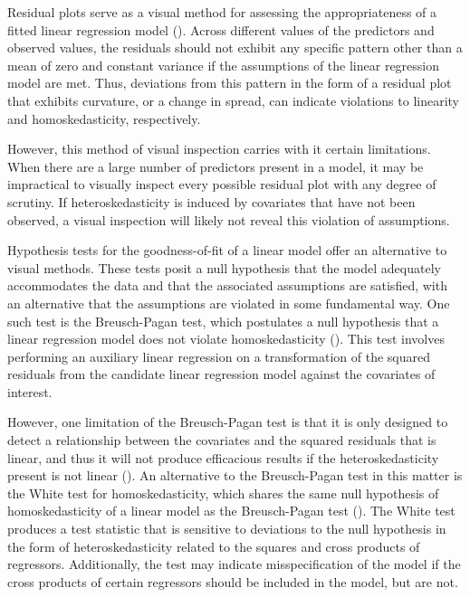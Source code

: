 \documentclass[12pt]{article} %
\theoremstyle{definition}
\begin{document}
		Residual plots serve as a visual method for assessing the appropriateness of a fitted linear regression model (\cite{Miles}). Across different values
		of the predictors and observed values, the residuals should not exhibit any specific pattern other than a mean of zero and constant variance if the assumptions of the linear regression model are met.
		Thus, deviations from this pattern in the form of a residual plot that exhibits curvature, or a change in spread, can indicate violations to linearity and homoskedasticity, respectively. 

		However, this method of visual inspection carries with it certain limitations. When there are a large number of predictors present in a model, it may be impractical to visually inspect every
		possible residual plot with any degree of scrutiny. If heteroskedasticity is induced by covariates that have not been observed, a visual inspection will likely
		not reveal this violation of assumptions.

		Hypothesis tests for the goodness-of-fit of a linear model offer an alternative to visual methods. These tests posit a null hypothesis that the model adequately accommodates the data and that
		the associated assumptions are satisfied, with an alternative that the assumptions are violated in some fundamental way. One such test is the Breusch-Pagan test, which postulates a null hypothesis
		that a linear regression model does not violate homoskedasticity (\cite{Breusch}). This test involves performing an auxiliary linear regression on a transformation of the squared residuals from
		the candidate linear regression model against the covariates of interest.

		However, one limitation of the Breusch-Pagan test is that it is only designed to detect a relationship between the covariates and the squared residuals that is linear, and thus it will not
		produce efficacious results if the heteroskedasticity present is not linear (\cite{Waldman}). An alternative to the Breusch-Pagan test in this matter is the White test for homoskedasticity,
		which shares the same null hypothesis of homoskedasticity of a linear model as the Breusch-Pagan test (\cite{White1980}). The White test produces a test statistic that is sensitive to deviations to
		the null hypothesis in the form of heteroskedasticity related to the squares and cross products of regressors. Additionally, the test may indicate misspecification of the model if the cross products
		of certain regressors should be included in the model, but are not.
\end{document}
